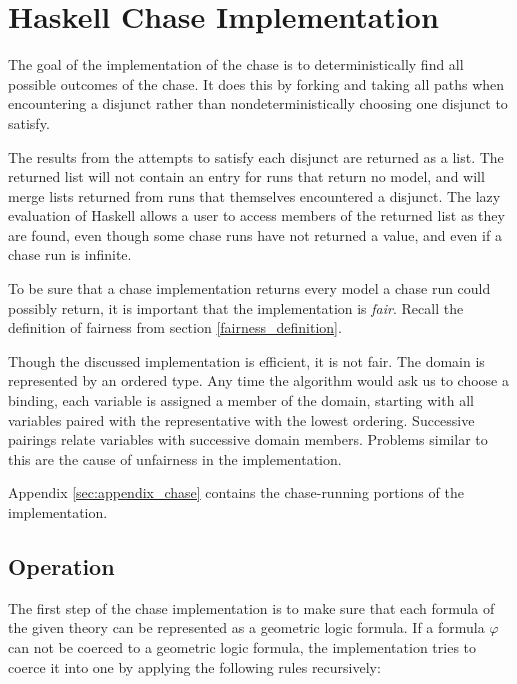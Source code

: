 \section{Haskell Chase Implementation}
\label{sec:implementation}

	The goal of the implementation of the chase is to deterministically find
	all possible outcomes of the chase. It does this by forking and taking all
	paths when encountering a disjunct rather than nondeterministically
	choosing one disjunct to satisfy.

	The results from the attempts to satisfy each disjunct are returned as a
	list. The returned list will not contain an entry for runs that return no
	model, and will merge lists returned from runs that themselves encountered
	a disjunct. The lazy evaluation of Haskell allows a user to access members
	of the returned list as they are found, even though some chase runs have
	not returned a value, and even if a chase run is infinite.

	To be sure that a chase implementation returns every model a chase run
	could possibly return, it is important that the implementation is
	\emph{fair}.  Recall the definition of fairness from section
	\ref{fairness_definition}.

	Though the discussed implementation is efficient, it is not fair. The
	domain is represented by an ordered type. Any time the algorithm would ask
	us to choose a binding, each variable is assigned a member of the domain,
	starting with all variables paired with the representative with the lowest
	ordering. Successive pairings relate variables with successive domain
	members. Problems similar to this are the cause of unfairness in the
	implementation.

	Appendix \ref{sec:appendix_chase} contains the chase-running portions of the
	implementation.

	\subsection{Operation}

		The first step of the chase implementation is to make sure that each
		formula of the given theory can be represented as a geometric logic
		formula. If a formula $\varphi$ can not be coerced to a geometric logic
		formula, the implementation tries to coerce it into one by applying the
		following rules recursively:

